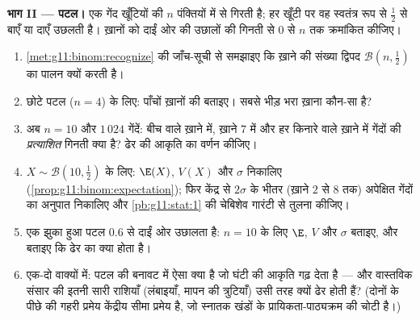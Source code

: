 \begin{problem}
\medskip
\noindent\textbf{भाग II --- पटल।}
एक गेंद खूँटियों की $n$ पंक्तियों में से गिरती है; हर खूँटी पर वह स्वतंत्र
रूप से  $\frac12$ से बाएँ या दाएँ उछलती है। ख़ानों को दाईं ओर की उछालों
की गिनती से $0$ से $n$ तक क्रमांकित कीजिए।
\begin{enumerate}[resume]
  \item \cref{met:g11:binom:recognize} की जाँच-सूची से समझाइए कि ख़ाने की संख्या द्विपद  $\mathcal B\!\left(n, \frac12\right)$ का
        पालन क्यों करती है।
  \item छोटे पटल ($n = 4$) के लिए: पाँचों ख़ानों की  बताइए। सबसे
        भीड़ भरा ख़ाना कौन-सा है?
  \item अब $n = 10$ और $1\,024$ गेंदें: बीच वाले ख़ाने में, ख़ाने $7$ में और हर
        किनारे वाले ख़ाने में गेंदों की \emph{प्रत्याशित} गिनती क्या है?
        ढेर की आकृति का वर्णन कीजिए।
  \item $X \sim \mathcal B\!\left(10, \frac12\right)$ के लिए: $\E(X)$, $V(X)$ और $\sigma$ निकालिए (\cref{prop:g11:binom:expectation}); फिर केंद्र से
        $2\sigma$ के भीतर (ख़ाने $2$ से $8$ तक) अपेक्षित गेंदों का अनुपात
        निकालिए और \cref{pb:g11:stat:1} की चेबिशेव गारंटी से तुलना कीजिए।
  \item एक झुका हुआ पटल  $0.6$ से दाईं ओर उछालता है: $n = 10$ के लिए
        $\E$, $V$ और $\sigma$ बताइए, और बताइए कि ढेर का क्या होता है।
  \item एक-दो वाक्यों में: पटल की बनावट में ऐसा क्या है जो घंटी की आकृति
        गढ़ देता है --- और वास्तविक संसार की इतनी सारी राशियाँ (लंबाइयाँ,
        मापन की त्रुटियाँ) उसी तरह क्यों ढेर होती हैं? (दोनों के पीछे की
        गहरी प्रमेय केंद्रीय सीमा प्रमेय है, जो स्नातक खंडों के
        प्रायिकता-पाठ्यक्रम की चोटी है।)
\end{enumerate}


\end{problem}
